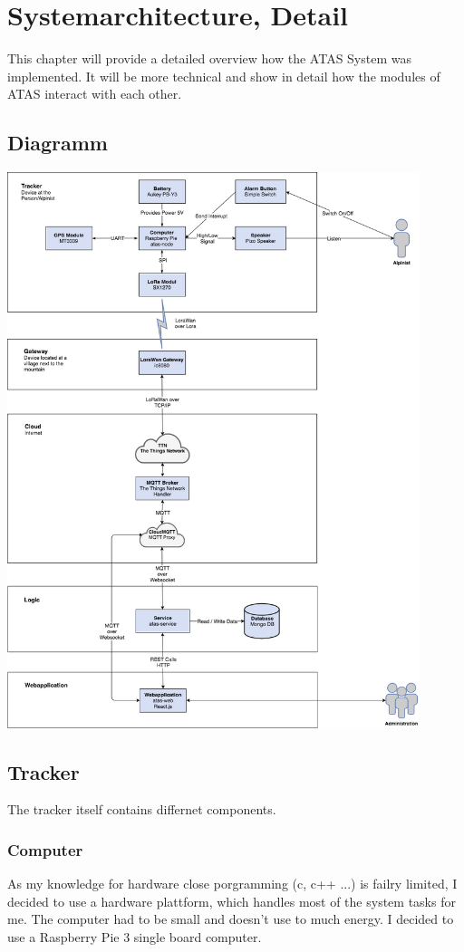 \documentclass[a4paper,11pt, oneside]{report}
\theoremstyle{definition}
\begin{document}
\chapter{Systemarchitecture, Detail}
This chapter will provide a detailed overview how the ATAS System was implemented. It will be more technical and show in detail how the modules of ATAS interact with each other.


\newpage
\noindent
\section{Diagramm}
\includegraphics[width=0.9\textwidth]{img/ATAS_SystemOverview_Detail.png}

\newpage
\section{Tracker}
The tracker itself contains differnet components.

\subsection{Computer}
As my knowledge for hardware close porgramming (c, c++ ...) is failry limited, I decided to use a hardware plattform, which handles most of the system tasks for me. The computer had to be small and doesn't use to much energy. I decided to use a Raspberry Pie 3  single board computer.
\end{document}
